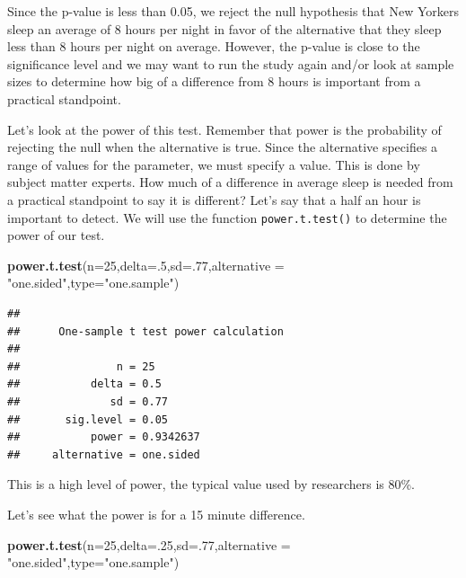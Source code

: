 \documentclass[
]{book}
\newenvironment{Shaded}{\begin{snugshade}}{\end{snugshade}}
\newcommand{\DataTypeTok}[1]{\textcolor[rgb]{0.13,0.29,0.53}{#1}}
\newcommand{\DecValTok}[1]{\textcolor[rgb]{0.00,0.00,0.81}{#1}}
\newcommand{\KeywordTok}[1]{\textcolor[rgb]{0.13,0.29,0.53}{\textbf{#1}}}
\newcommand{\NormalTok}[1]{#1}
\newcommand{\StringTok}[1]{\textcolor[rgb]{0.31,0.60,0.02}{#1}}
\begin{document}
Since the p-value is less than 0.05, we reject the null hypothesis that New Yorkers sleep an average of 8 hours per night in favor of the alternative that they sleep less than 8 hours per night on average. However, the p-value is close to the significance level and we may want to run the study again and/or look at sample sizes to determine how big of a difference from 8 hours is important from a practical standpoint.

Let's look at the power of this test. Remember that power is the probability of rejecting the null when the alternative is true. Since the alternative specifies a range of values for the parameter, we must specify a value. This is done by subject matter experts. How much of a difference in average sleep is needed from a practical standpoint to say it is different? Let's say that a half an hour is important to detect. We will use the function \texttt{power.t.test()} to determine the power of our test.

\begin{Shaded}
\begin{Highlighting}[]
\KeywordTok{power.t.test}\NormalTok{(}\DataTypeTok{n=}\DecValTok{25}\NormalTok{,}\DataTypeTok{delta=}\NormalTok{.}\DecValTok{5}\NormalTok{,}\DataTypeTok{sd=}\NormalTok{.}\DecValTok{77}\NormalTok{,}\DataTypeTok{alternative =} \StringTok{"one.sided"}\NormalTok{,}\DataTypeTok{type=}\StringTok{"one.sample"}\NormalTok{)}
\end{Highlighting}
\end{Shaded}

\begin{verbatim}
## 
##      One-sample t test power calculation 
## 
##               n = 25
##           delta = 0.5
##              sd = 0.77
##       sig.level = 0.05
##           power = 0.9342637
##     alternative = one.sided
\end{verbatim}

This is a high level of power, the typical value used by researchers is 80\%.

Let's see what the power is for a 15 minute difference.

\begin{Shaded}
\begin{Highlighting}[]
\KeywordTok{power.t.test}\NormalTok{(}\DataTypeTok{n=}\DecValTok{25}\NormalTok{,}\DataTypeTok{delta=}\NormalTok{.}\DecValTok{25}\NormalTok{,}\DataTypeTok{sd=}\NormalTok{.}\DecValTok{77}\NormalTok{,}\DataTypeTok{alternative =} \StringTok{"one.sided"}\NormalTok{,}\DataTypeTok{type=}\StringTok{"one.sample"}\NormalTok{)}
\end{Highlighting}
\end{Shaded}
\end{document}
